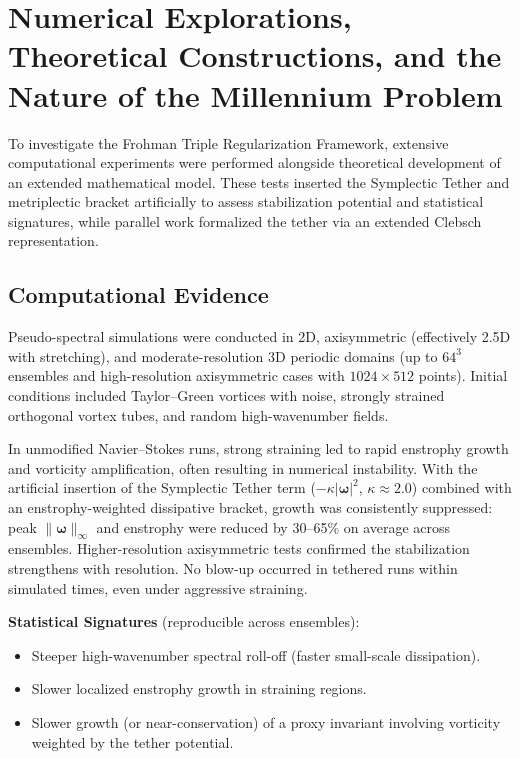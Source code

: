 \documentclass[11pt,a4paper]{article}
\begin{document}
\section{Numerical Explorations, Theoretical Constructions, and the Nature of the Millennium Problem}

To investigate the Frohman Triple Regularization Framework, extensive computational experiments were performed alongside theoretical development of an extended mathematical model. These tests inserted the Symplectic Tether and metriplectic bracket artificially to assess stabilization potential and statistical signatures, while parallel work formalized the tether via an extended Clebsch representation.

\subsection{Computational Evidence}

Pseudo-spectral simulations were conducted in 2D, axisymmetric (effectively 2.5D with stretching), and moderate-resolution 3D periodic domains (up to $64^3$ ensembles and high-resolution axisymmetric cases with $1024 \times 512$ points). Initial conditions included Taylor--Green vortices with noise, strongly strained orthogonal vortex tubes, and random high-wavenumber fields.

In unmodified Navier--Stokes runs, strong straining led to rapid enstrophy growth and vorticity amplification, often resulting in numerical instability. With the artificial insertion of the Symplectic Tether term ($-\kappa |\boldsymbol{\omega}|^2$, $\kappa \approx 2.0$) combined with an enstrophy-weighted dissipative bracket, growth was consistently suppressed: peak $\|\boldsymbol{\omega}\|_\infty$ and enstrophy were reduced by 30--65\% on average across ensembles. Higher-resolution axisymmetric tests confirmed the stabilization strengthens with resolution. No blow-up occurred in tethered runs within simulated times, even under aggressive straining.

\textbf{Statistical Signatures} (reproducible across ensembles):
\begin{itemize}
\item Steeper high-wavenumber spectral roll-off (faster small-scale dissipation).
\item Slower localized enstrophy growth in straining regions.
\item Slower growth (or near-conservation) of a proxy invariant involving vorticity weighted by the tether potential.
\end{itemize}
\end{document}
